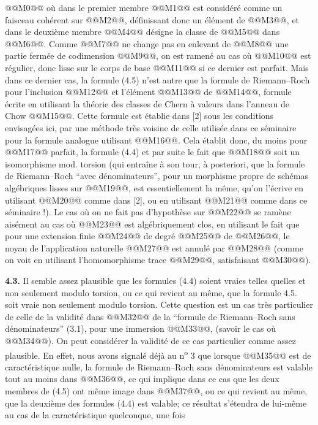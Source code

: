 
@@M0@@
où dans le premier membre @@M1@@ est considéré comme un faisceau cohérent sur @@M2@@, définissant donc un élément de @@M3@@, et dans le deuxième membre @@M4@@ désigne la classe de @@M5@@ dans @@M6@@. Comme @@M7@@ ne change pas en enlevant de @@M8@@ une partie fermée de codimension @@M9@@, on est ramené au cas où @@M10@@ est régulier, donc lisse sur le corps de base @@M11@@ si ce dernier est parfait. Mais dans ce dernier cas, la formule (4.5) n'est autre que la formule de Riemann--Roch pour l'inclusion @@M12@@ et l'élément @@M13@@ de @@M14@@, formule écrite en utilisant la théorie des classes de Chern à valeurs dans l'anneau de Chow @@M15@@. Cette formule est établie dans [2] sous les conditions envisagées ici, par une méthode très voisine de celle utilisée dans ce séminaire pour la formule analogue utilisant @@M16@@. Cela établit donc, du moins pour @@M17@@ parfait, la formule (4.4) et par suite le fait que @@M18@@ soit un isomorphisme mod. torsion (qui entraîne à son tour, à posteriori, que la formule de Riemann--Roch ``avec dénominateurs'', pour un morphisme propre de schémas algébriques lisses sur @@M19@@, est essentiellement la même, qu'on l'écrive en utilisant @@M20@@ comme dans [2], ou en utilisant @@M21@@ comme dans ce séminaire !). Le cas où on ne fait pas d'hypothèse sur @@M22@@ se ramène aisément au cas où @@M23@@ est algébriquement clos, en utilisant le fait que pour une extension finie @@M24@@ de degré @@M25@@ de @@M26@@, le noyau de l'application naturelle @@M27@@ est annulé par @@M28@@ (comme on voit en utilisant l'homomorphisme trace @@M29@@, satisfaisant @@M30@@).

\textbf{4.3.} Il semble assez plausible que les formules (4.4) soient vraies telles quelles et non seulement modulo torsion, ou ce qui revient au même, que la formule 4.5. soit vraie non seulement modulo torsion. Cette question est un cas très particulier de celle de la validité dans @@M32@@ de la ``formule de Riemann--Roch sans dénominateurs'' (3.1), pour une immersion @@M33@@, (savoir le cas où @@M34@@). On peut considérer la validité de ce cas particulier comme assez plausible. En effet, nous avons signalé déjà au n\textsuperscript{o} 3 que lorsque @@M35@@ est de caractéristique nulle, la formule de Riemann--Roch sans dénominateurs est valable tout au moins dans @@M36@@, ce qui implique dans ce cas que les deux membres de (4.5) ont même image dans @@M37@@, ou ce qui revient au même, que la deuxième des formules (4.4) est valable; ce résultat s'étendra de lui-même au cas de la caractéristique quelconque, une fois 
